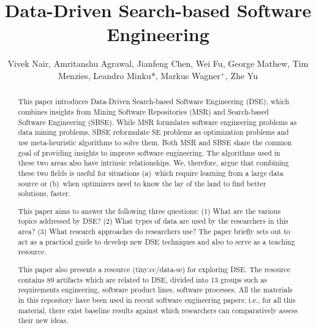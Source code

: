 \documentclass[sigconf]{acmart}
\begin{document}


\title{Data-Driven Search-based Software Engineering}

\author{Vivek Nair, Amritanshu Agrawal, Jianfeng Chen, Wei Fu, George Mathew, Tim Menzies, Leandro Minku*, Markus Wagner$^+$, Zhe Yu}
\email{}


\begin{abstract}
This paper introduces Data-Driven Search-based Software Engineering (DSE), which combines insights from Mining Software Repositories (MSR) and Search-based Software Engineering (SBSE). While MSR formulates software engineering problems as data mining problems, SBSE reformulate SE problems as optimization problems and use meta-heuristic algorithms to solve them. Both MSR and SBSE share the common goal of providing insights to improve software engineering. The algorithms used in these two areas also have intrinsic relationships.  
We, therefore, argue that combining these two fields
is useful for situations (a)~which require learning from a large data
source or (b)~when optimizers need to know the lay of the land to find better solutions, faster.

This paper aims to answer the following three questions: (1) What are the various topics addressed by DSE? (2) What types of data are used by the researchers in this area? (3) What research approaches do researchers use? The paper briefly sets out to act as a practical guide to develop new DSE techniques and also to serve as a teaching resource.

This paper also presents a  resource (tiny.cc/data-se) for exploring DSE.  The resource contains 89 artifacts which are related to DSE,
divided into 13 groups such as requirements engineering, software product lines, software processes.
All the materials in this repository
have been used in recent software engineering papers; i.e., for all this material, there exist baseline results against which researchers can comparatively assess their new ideas.
\end{abstract}
\end{document}
